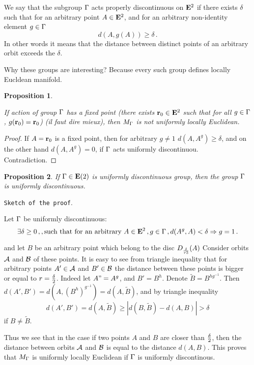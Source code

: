 \documentclass[12pt]{article}
\newtheorem{proposition}{Proposition}
\theoremstyle{definition}
\numberwithin{equation}{section}
\begin{document}
We say that the subgroup ${\Gamma}$ acts properly discontinuous
on ${\bf E}^2$ if there exists $\delta$ such that
for an arbitrary point $A\in {\bf E}^2$, and for an arbitrary
non-identity element $g\in {\Gamma}$ 
        $$
      d(A,g(A))\geq \delta\,.
        $$
 In other words it means that the distance between 
distinct points of an arbitrary orbit exceeds the  $\delta$.

Why these groups are interesting?  Because every such group
defines locally Eucldean manifold. 



\begin{proposition}\label{1}

If action of group ${\Gamma}$ has a fixed point
 (there exists ${\bf r}_0\in {\bf E}^2$ such that 
for all $g\in {\Gamma}$,
$g({\bf r}_0)={\bf r}_0$) ({\it il faut dire mieux}),
then $M_{\Gamma}$ is not uniformly locally 
Euclidean.
\end {proposition}
\begin{proof}
 If $A={\bf r}_0$ is a fixed point, then
for arbitrary $g\not=1$  $d(A,A^g)\geq \delta$, and
on the other hand $d(A,A^g)=0$, if ${\Gamma}$ 
acts uniformly discontinuou. Contradiction.
\end{proof}


\begin{proposition}\label{2}
If ${\Gamma}\in {\bf E}(2)$  is uniformly discontinuous group, then
the group ${\Gamma}$ is uniformly discontinuous.  

\end{proposition}

 {\tt Sketch of the proof}.

Let ${\Gamma}$ be uniformly discontinuous:
         $$
\exists\delta\geq 0 \,,,
\hbox{such that for an arbitrary}\,\,
 A\in {\bf E}^2\,, g\in {\Gamma}\,, d(A^g,A)<\delta \Rightarrow
   g=1\,.    
        $$

and let $B$ be an arbitrary point  
which belong to the disc $D_{\delta\over r3}(A)$
Consider orbits ${\cal A}$ and ${\cal B}$ of these points.
It is easy to see from triangle inequality that
for arbitrary points $A'\in{\cal A}$ and $B'\in {\cal B}$
the distance between these points is bigger or equal to
  $r={\delta\over 2}$. Indeed let $A"=A^g$, and 
$B'=B^h$. Denote $\tilde B=B^{hg^{-1}}$. Then
$d(A',B')=
d\left(A, \left(B^h\right)^{g^{-1}}\right)=
d\left(A, \tilde B\right)$, and by triangle inequality
     $$
d(A',B')=d(A,\tilde B)\geq \left|d(B,\tilde B)-d(A,B)\right|
>\delta
     $$
if $B\not=\tilde B$.


Thus we see that in the case if two points $A$
and $B$ are closer than $\delta\over 2$,
then the distance between orbits ${\cal A}$ and ${\cal B}$
is equal to the distance $d(A,B)$.
This proves that $M_{\Gamma}$ is uniformly locally Euclidean
if ${\Gamma}$ is uniformly discontinous.
\end{document}
